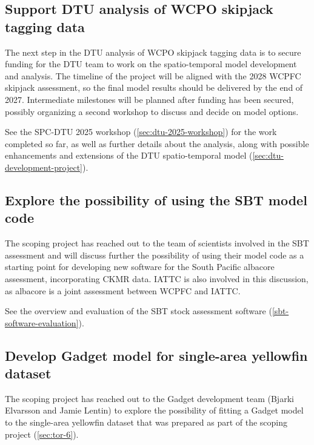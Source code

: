 \documentclass{SCreport}
\begin{document}
\vspace{2ex}

\subsection{Support DTU analysis of WCPO skipjack tagging data}
\label{sec:dtu-support-tagging}

The next step in the DTU analysis of WCPO skipjack tagging data is to secure
funding for the DTU team to work on the spatio-temporal model development and
analysis. The timeline of the project will be aligned with the 2028 WCPFC
skipjack assessment, so the final model results should be delivered by the end
of 2027. Intermediate milestones will be planned after funding has been secured,
possibly organizing a second workshop to discuss and decide on model options.

See the SPC-DTU 2025 workshop (\autoref{sec:dtu-2025-workshop}) for the work
completed so far, as well as further details about the analysis, along with
possible enhancements and extensions of the DTU spatio-temporal model
(\autoref{sec:dtu-development-project}).

\vspace{2ex}

\subsection{Explore the possibility of using the SBT model code}
\label{sec:sbt-model-code}

The scoping project has reached out to the team of scientists involved in the
SBT assessment and will discuss further the possibility of using their model
code as a starting point for developing new software for the South Pacific
albacore assessment, incorporating CKMR data. IATTC is also involved in this
discussion, as albacore is a joint assessment between WCPFC and IATTC.

See the overview and evaluation of the SBT stock assessment software
(\autoref{sbt-software-evaluation}).

\vspace{2ex}

\subsection{Develop Gadget model for single-area yellowfin dataset}
\label{sec:yft-gadget}

The scoping project has reached out to the Gadget development team (Bjarki
Elvarsson and Jamie Lentin) to explore the possibility of fitting a Gadget model
to the single-area yellowfin dataset that was prepared as part of the scoping
project (\autoref{sec:tor-6}).
\end{document}
